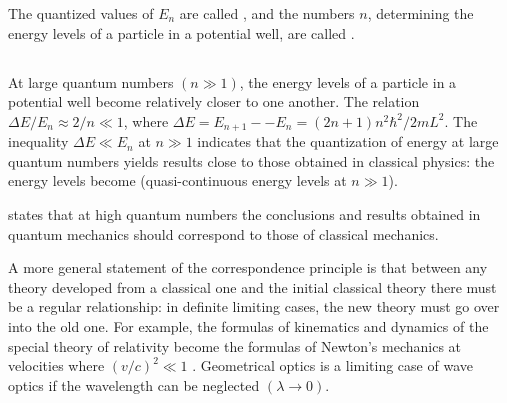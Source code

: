 The quantized values of $E_{n}$ are called , and the numbers $n$, determining the energy levels of a particle in a potential well, are called .

\subsection{}\label{38.4.4} At large quantum numbers $( n \gg 1)$, the energy levels of a particle in a potential well become relatively closer to one another. The relation $\Delta E/E_{n} \approx 2/n \ll 1$, where $\Delta E = E_{n+1} -
- E_{n} = (2n +1) n^{2}\hbar^{2}/2mL^{2}$. The inequality $\Delta E \ll E_{n}$ at $n \gg 1$ indicates that the quantization of energy at large quantum numbers yields results close to those obtained in classical physics: the energy levels become  (quasi-continuous energy levels at $n \gg 1$).

 states that at high quantum numbers the conclusions and results obtained in quantum mechanics should correspond to those of classical mechanics.

A more general statement of the correspondence principle is
that between any theory developed from a classical one and the
initial classical theory there must be a regular relationship:
in definite limiting cases, the new theory must go over into the old one. For example, the formulas of kinematics and dynamics of the special theory of relativity become the formulas of Newton's mechanics at velocities where $(v/c)^{2} \ll 1$ . Geometrical optics is a limiting case of wave optics if the wavelength can be neglected $(\lambda \to 0)$.

